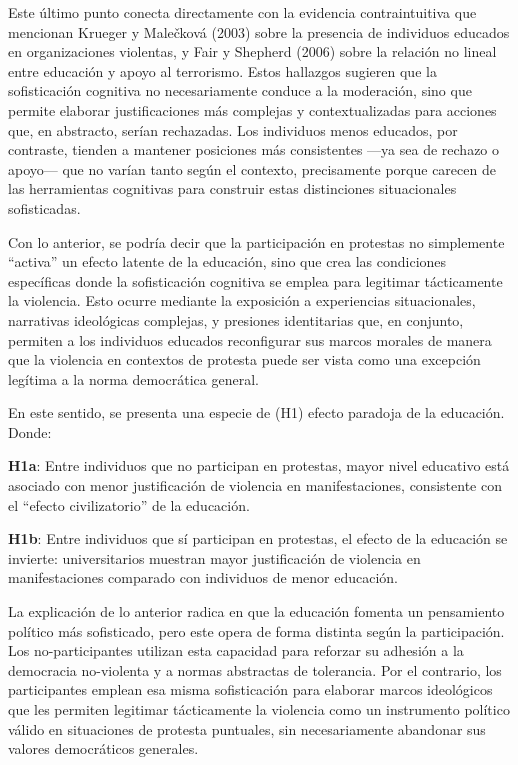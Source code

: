 \documentclass[
  13pt,
]{article}
\begin{document}
Este último punto conecta directamente con la evidencia contraintuitiva
que mencionan Krueger y Malečková (2003) sobre la presencia de
individuos educados en organizaciones violentas, y Fair y Shepherd
(2006) sobre la relación no lineal entre educación y apoyo al
terrorismo. Estos hallazgos sugieren que la sofisticación cognitiva no
necesariamente conduce a la moderación, sino que permite elaborar
justificaciones más complejas y contextualizadas para acciones que, en
abstracto, serían rechazadas. Los individuos menos educados, por
contraste, tienden a mantener posiciones más consistentes ---ya sea de
rechazo o apoyo--- que no varían tanto según el contexto, precisamente
porque carecen de las herramientas cognitivas para construir estas
distinciones situacionales sofisticadas.

Con lo anterior, se podría decir que la participación en protestas no
simplemente ``activa'' un efecto latente de la educación, sino que crea
las condiciones específicas donde la sofisticación cognitiva se emplea
para legitimar tácticamente la violencia. Esto ocurre mediante la
exposición a experiencias situacionales, narrativas ideológicas
complejas, y presiones identitarias que, en conjunto, permiten a los
individuos educados reconfigurar sus marcos morales de manera que la
violencia en contextos de protesta puede ser vista como una excepción
legítima a la norma democrática general.

En este sentido, se presenta una especie de (H1) efecto paradoja de la
educación. Donde:

\textbf{H1a}: Entre individuos que no participan en protestas, mayor
nivel educativo está asociado con menor justificación de violencia en
manifestaciones, consistente con el ``efecto civilizatorio'' de la
educación.

\textbf{H1b}: Entre individuos que sí participan en protestas, el efecto
de la educación se invierte: universitarios muestran mayor justificación
de violencia en manifestaciones comparado con individuos de menor
educación.

La explicación de lo anterior radica en que la educación fomenta un
pensamiento político más sofisticado, pero este opera de forma distinta
según la participación. Los no-participantes utilizan esta capacidad
para reforzar su adhesión a la democracia no-violenta y a normas
abstractas de tolerancia. Por el contrario, los participantes emplean
esa misma sofisticación para elaborar marcos ideológicos que les
permiten legitimar tácticamente la violencia como un instrumento
político válido en situaciones de protesta puntuales, sin necesariamente
abandonar sus valores democráticos generales.
\end{document}
